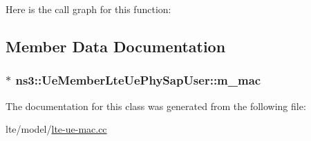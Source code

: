 Here is the call graph for this function\+:




\subsection{Member Data Documentation}
\subsubsection[{\texorpdfstring{m\+\_\+mac}{m_mac}}]{$\ast$ ns3\+::\+Ue\+Member\+Lte\+Ue\+Phy\+Sap\+User\+::m\+\_\+mac\hspace{0.3cm}{\ttfamily [private]}}\hypertarget{classns3_1_1UeMemberLteUePhySapUser_ab6d2ec8968246e2632c6f35c6fe72b20}{}\label{classns3_1_1UeMemberLteUePhySapUser_ab6d2ec8968246e2632c6f35c6fe72b20}


The documentation for this class was generated from the following file\+:\begin{DoxyCompactItemize}
\item 
lte/model/\hyperlink{lte-ue-mac_8cc}{lte-\/ue-\/mac.\+cc}\end{DoxyCompactItemize}
